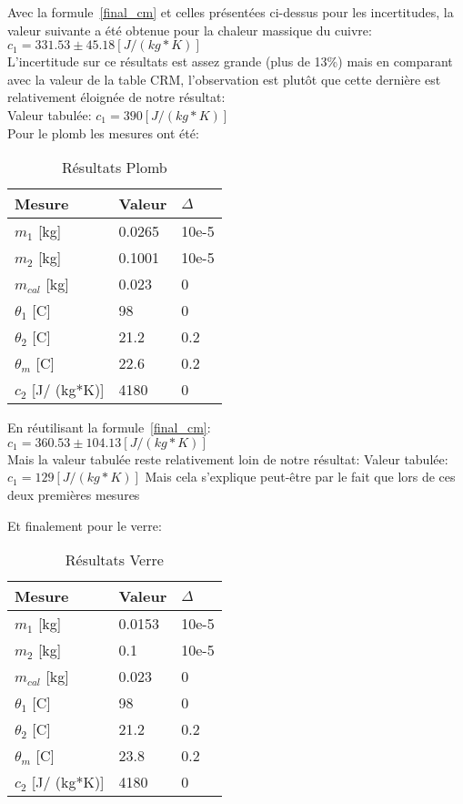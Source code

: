 Avec la formule~\eqref{final_cm} et celles présentées ci-dessus pour les incertitudes, la valeur suivante a été obtenue pour la chaleur massique du cuivre:\\
$c_1=331.53\pm 45.18[J/ (kg*K)]$\\
L'incertitude sur ce résultats est assez grande (plus de 13\%) mais en comparant avec la valeur de la table CRM, l'observation est plutôt que cette dernière est relativement éloignée de notre résultat:\\
Valeur tabulée: $c_1 = 390[J/ (kg*K)]$\\

Pour le plomb les mesures ont été:
\begin{table}[!h]
    \centering
    \caption{Résultats Plomb}
    \begin{tabular}{|l|l|l|}
	\hline
	Mesure	&Valeur	&$\Delta$\\
	\hline
	$m_1$ [kg]	&0.0265	&10e-5\\
	$m_2$ [kg]	&0.1001	&10e-5\\
	$m_{cal}$ [kg]	&0.023	&0\\
	$\theta_1$ [C\degree]	&98	&0\\
	$\theta_2$ [C\degree]	&21.2	&0.2\\
	$\theta_m$ [C\degree]	&22.6	&0.2\\
	$c_2$ [J/ (kg*K)]	&4180	&0\\
	\hline
    \end{tabular}
\end{table}

En réutilisant la formule~\eqref{final_cm}:\\
$c_1 = 360.53 \pm 104.13[J/ (kg*K)]$\\
Mais la valeur tabulée reste relativement loin de notre résultat:
Valeur tabulée: $c_1 = 129[J/ (kg*K)]$
Mais cela s'explique peut-être par le fait que lors de ces deux premières mesures

Et finalement pour le verre:
\begin{table}[!h]
    \centering
    \caption{Résultats Verre}
    \begin{tabular}{|l|l|l|}
	\hline
	Mesure	&Valeur	&$\Delta$\\
	\hline
	$m_1$ [kg]	&0.0153	&10e-5\\
	$m_2$ [kg]	&0.1	&10e-5\\
	$m_{cal}$ [kg]	&0.023	&0\\
	$\theta_1$ [C\degree]	&98	&0\\
	$\theta_2$ [C\degree]	&21.2	&0.2\\
	$\theta_m$ [C\degree]	&23.8	&0.2\\
	$c_2$ [J/ (kg*K)]	&4180	&0\\
	\hline
    \end{tabular}
\end{table}

